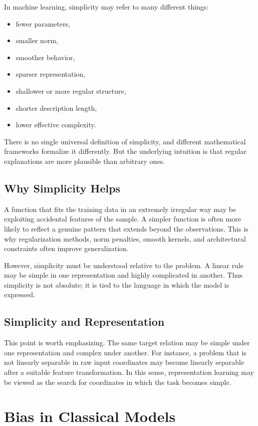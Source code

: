 In machine learning, simplicity may refer to many different things:
\begin{itemize}
    \item fewer parameters,
    \item smaller norm,
    \item smoother behavior,
    \item sparser representation,
    \item shallower or more regular structure,
    \item shorter description length,
    \item lower effective complexity.
\end{itemize}

There is no single universal definition of simplicity, and different mathematical frameworks formalize it differently. But the underlying intuition is that regular explanations are more plausible than arbitrary ones.

\subsection{Why Simplicity Helps}

A function that fits the training data in an extremely irregular way may be exploiting accidental features of the sample. A simpler function is often more likely to reflect a genuine pattern that extends beyond the observations. This is why regularization methods, norm penalties, smooth kernels, and architectural constraints often improve generalization.

However, simplicity must be understood relative to the problem. A linear rule may be simple in one representation and highly complicated in another. Thus simplicity is not absolute; it is tied to the language in which the model is expressed.

\subsection{Simplicity and Representation}

This point is worth emphasizing. The same target relation may be simple under one representation and complex under another. For instance, a problem that is not linearly separable in raw input coordinates may become linearly separable after a suitable feature transformation. In this sense, representation learning may be viewed as the search for coordinates in which the task becomes simple.

\section{Bias in Classical Models}

